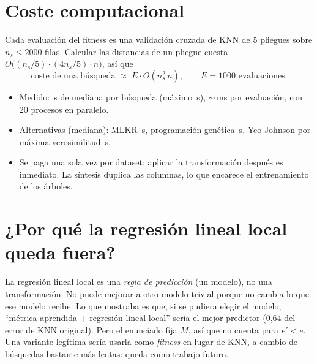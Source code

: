 \documentclass[apuntes]{uc3mmaster}
\begin{document}
\section{Coste computacional}\label{sec:coste}
Cada evaluación del fitness es una validación cruzada de KNN de 5 pliegues sobre $n_s\le2000$ filas. Calcular las
distancias de un pliegue cuesta $O\big((n_s/5)\cdot(4n_s/5)\cdot n\big)$, así que
\[
\text{coste de una búsqueda}\;\approx\;E\cdot O(n_s^2\,n),\qquad E=1000\text{ evaluaciones}.
\]
\begin{itemize}
\item Medido: \segMediana\,s de mediana por búsqueda (máximo \segMax\,s), $\sim$\msPorEval\,ms por evaluación, con
20 procesos en paralelo.
\item Alternativas (mediana): MLKR \segMLKR\,s, programación genética \segPG\,s, Yeo-Johnson por máxima verosimilitud
\segYJMV\,s.
\item Se paga una sola vez por dataset; aplicar la transformación después es inmediato. La síntesis duplica las
columnas, lo que encarece el entrenamiento de los árboles.
\end{itemize}

\section{¿Por qué la regresión lineal local queda fuera?}\label{sec:llr}
\begin{figure}[h]\centering
{}
\end{figure}
La regresión lineal local es una \emph{regla de predicción} (un modelo), no una transformación. No puede mejorar a
otro modelo trivial porque no cambia lo que ese modelo recibe. Lo que mostraba es que, si se pudiera elegir el
modelo, ``métrica aprendida + regresión lineal local'' sería el mejor predictor (0,64 del error de KNN original).
Pero el enunciado fija $M$, así que no cuenta para $e'<e$. Una variante legítima sería usarla como \emph{fitness}
en lugar de KNN, a cambio de búsquedas bastante más lentas: queda como trabajo futuro.
\end{document}

